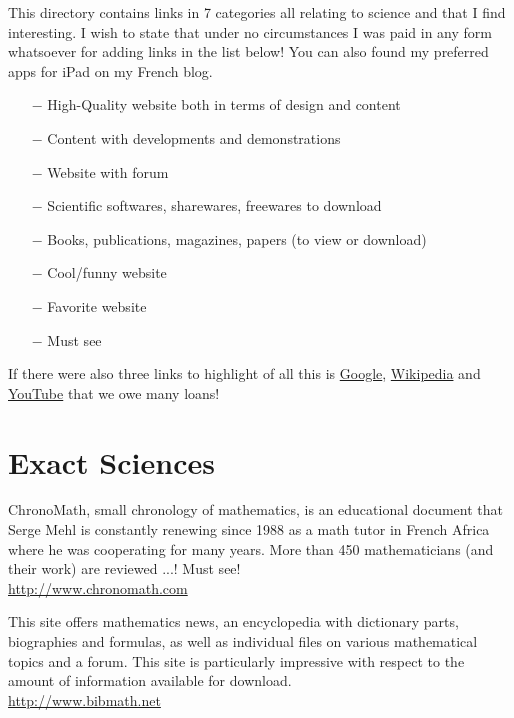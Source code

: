 	This directory contains links in 7 categories all relating to science and that I find interesting. I wish to state that under no circumstances I was paid in any form whatsoever for adding links in the list below! You can also found my preferred apps for iPad on my French blog. 
	
	\begin{itemize}	 
		\item[$-$] {\Large {}} High-Quality website both in terms of design and content
		\item[$-$] {\Large {}} Content with developments and demonstrations
		\item[$-$] {\Large {}} Website with forum
		\item[$-$] {\Large {}} Scientific softwares, sharewares, freewares to download
		\item[$-$] {\Large {}} Books, publications, magazines, papers (to view or download)
		\item[$-$] {\Large {}} Cool/funny website
		\item[$-$] {\Large {}} Favorite website
		\item[$-$] {\Large {}} Must see 
	\end{itemize}
	
	If there were also three links to highlight of all this is \href{http://www.google.com}{\color{blue} Google}, \href{http://www.wikipedia.com}{\color{blue} Wikipedia} and \href{http://www.youtube.com}{\color{blue} YouTube} that we owe many loans!		

	\pagebreak

	\section{Exact Sciences}

	{\Large {}}{\Large {}}{\Large {}}{\Large {}}{\Large {}}{\Large {}}\bcdfrance{} ChronoMath, small chronology of mathematics, is an educational document that Serge Mehl is constantly renewing since 1988 as a math tutor in French Africa where he was cooperating for many years. More than 450 mathematicians (and their work) are reviewed ...! Must see!\\
	\href{http://www.chronomath.com}{\color{blue} http://www.chronomath.com}
	
	{\Large {}}{\Large {}}{\Large {}}\bcdfrance{} This site offers mathematics news, an encyclopedia with dictionary parts, biographies and formulas, as well as individual files on various mathematical topics and a forum. This site is particularly impressive with respect to the amount of information available for download. \\
	\href{http://www.bibmath.net}{\color{blue} http://www.bibmath.net} 
	
